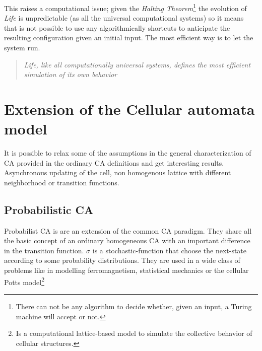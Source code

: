 This raises a computational issue; given the \emph{Halting
Theorem}\footnote{There can not be any algorithm to decide whether, given an
input, a Turing machine will accept or not.} the evolution of \emph{Life} is
unpredictable (as all the universal computational systems) so it means that is
not possible to use any algorithmically shortcuts to anticipate the resulting
configuration given an initial input. The most efficient way is to let the
system run.

\begin{quotation}
\em Life, like all computationally universal systems, defines the most efficient
simulation of its own behavior\cite{Ilachinski2001}
\end{quotation}





\section{Extension of the Cellular automata model}
It is possible to relax some of the assumptions in the general characterization
of CA provided in the ordinary CA definitions and get interesting results.
Asynchronous updating of the cell, non homogenous lattice with different
neighborhood or transition functions.

\subsection{Probabilistic CA}
Probabilist CA is are an extension of the common CA paradigm. They share all
the basic concept of an ordinary homogeneous
CA with an important difference in the transition function.
$\sigma$ is a stochastic-function that choose the next-state
according to some probability distributions. They are used in a wide class of
problems like in modelling ferromagnetism, statistical mechanics
\cite{Vichniac1984} or the cellular Potts model\footnote{Is a computational
lattice-based model to simulate the collective behavior of cellular structures.}


